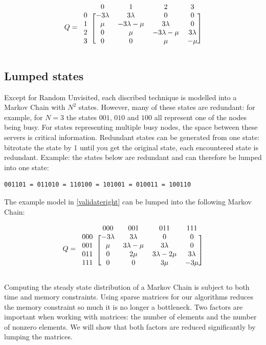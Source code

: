 \documentclass[10pt,a4paper]{article}
\begin{document}
\[ Q =
  \begin{blockarray}{ccccc}
    & 0 & 1 & 2 & 3 \\
    \begin{block}{c[cccc]}
    0 & -3\lambda & 3\lambda & 0 & 0 \\
    1 & \mu & -3\lambda-\mu & 3\lambda & 0 \\
    2 & 0 & \mu & -3\lambda-\mu & 3\lambda \\
    3 & 0 & 0 & \mu & -\mu \\
    \end{block}
  \end{blockarray}
\]

\subsection{Lumped states}
\label{lump}

Except for Random Unvisited, each discribed technique is modelled into a Markov Chain with $N^2$ states. However, many of these states are redundant: for example, for $N=3$ the states $001$, $010$ and $100$ all represent one of the nodes being busy. For states representing multiple busy nodes, the space between these servers is critical information. Redundant states can be generated from one state: bitrotate the state by 1 until you get the original state, each encountered state is redundant.
Example: the states below are redundant and can therefore be lumped into one state:
\begin{verbatim}
001101 = 011010 = 110100 = 101001 = 010011 = 100110
\end{verbatim}

The example model in \ref{validateright} can be lumped into the following Markov Chain:

\[ Q =
  \begin{blockarray}{ccccc}
    & 000 & 001 & 011 & 111 \\
    \begin{block}{c[cccc]}
    000 & -3\lambda & 3\lambda & 0 & 0 \\
    001 & \mu & 3\lambda-\mu & 3\lambda & 0 \\
    011 & 0 & 2\mu & 3\lambda-2\mu & 3\lambda \\
    111 & 0 & 0 & 3\mu & -3\mu \\
    \end{block}
  \end{blockarray}
\]

Computing the steady state distribution of a Markov Chain is subject to both time and memory constraints. Using sparse matrices for our algorithms reduces the memory constraint so much it is no longer a bottleneck.
Two factors are important when working with matrices: the number of elements and the number of nonzero elements. We will show that both factors are reduced significantly by lumping the matrices.
\end{document}
